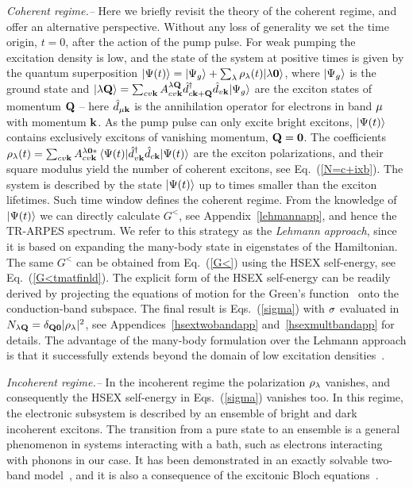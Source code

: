 \documentclass[twocolumn,aps,a4paper,superscriptaddress]{revtex4-2}
\begin{document}
{\em Coherent regime.--} Here we briefly revisit the
theory of the coherent regime, and offer an alternative perspective.
Without any
loss of generality we set
the time origin, $t=0$, after the action of the pump pulse. For weak
pumping the excitation density is low, and
the state of the system at positive times is given by the quantum
superposition
$|\Psi(t)\rangle=|\Psi_{g}\rangle+\sum_{\lambda}\rho_{\lambda}(t)|\lambda\mathbf 0\rangle$, where
$|\Psi_{g}\rangle$ is the ground state and
$|\lambda{\mathbf Q}\rangle=\sum_{cv{\mathbf k}}A^{\lambda{\mathbf Q}}_{cv{\mathbf k}}\hat{d}^{\dag}_{c{\mathbf k}+{\mathbf Q}}\hat{d}_{v{\mathbf k}}|\Psi_{g}\rangle$
are the exciton states of momentum ${\mathbf Q}$ -- here
$\hat{d}_{\mu{\mathbf k}}$ is the annihilation operator for electrons in band
$\mu$ with momentum ${\mathbf k}$. As the pump pulse
can only excite bright excitons,  $|\Psi(t)\rangle$ contains
exclusively excitons of vanishing momentum, ${\mathbf Q}=\mathbf 0$. The coefficients
$\rho_{\lambda}(t)=\sum_{cv{\mathbf k}}A^{\lambda\mathbf 0\ast}_{cv{\mathbf k}}\,
\langle\Psi(t)|\hat{d}^{\dag}_{v{\mathbf k}}\hat{d}_{c{\mathbf k}}|\Psi(t)\rangle$ are the
exciton polarizations, and their square modulus yield the number of
coherent excitons, see Eq.~(\ref{N=c+ixb}). The
system is described by the state $|\Psi(t)\rangle$
up to times smaller than the exciton lifetimes.
Such time window defines the coherent regime. From
the knowledge of $|\Psi(t)\rangle$ we can directly calculate $G^{<}$, see
Appendix~\ref{lehmannapp}, and hence the
TR-ARPES spectrum. We refer to this strategy as the {\em Lehmann
approach}, since it is based on expanding the many-body state in
eigenstates of the Hamiltonian.
The same $G^{<}$ can be
obtained from Eq.~(\ref{G<}) using
the HSEX self-energy, see Eq.~(\ref{G<tmatfinld}).
The explicit form
of the HSEX self-energy can be readily derived
by projecting the equations of motion for the Green's
function~\cite{perfetto_pump-driven_2019,perfetto_time-resolved_2020} onto
the conduction-band subspace. The final result is
Eqs.~(\ref{sigma}) with $\sigma$ evaluated in
$N_{\lambda{\mathbf Q}}=\delta_{{\mathbf Q}\mathbf 0}|\rho_{\lambda}|^{2}$, see
Appendices~\ref{hsextwobandapp} and~\ref{hsexmultbandapp} for details.
The advantage of the many-body formulation over the
Lehmann approach is
that it successfully extends beyond the domain of low excitation
densities~\cite{pareek_driving_2026}.

{\em Incoherent regime.--}
In the incoherent regime the
polarization $\rho_{\lambda}$ vanishes, and consequently the HSEX
self-energy in Eqs.~(\ref{sigma}) vanishes too.
In this regime, the
electronic subsystem is described by an ensemble of bright and dark
incoherent excitons.
The transition from a pure state to an ensemble is a general
phenomenon in systems interacting with a bath, such as
electrons interacting with phonons in our case.
It has been demonstrated in an exactly  solvable two-band
model~\cite{stefanucci_from-carriers_2021,zhang_long-lived_2025},
and it is also a consequence of the excitonic Bloch
equations~\cite{thranhardt_quantum_2000,selig_exciton_2016,brem_exciton_2018,stefanucci_excitonic_2025}.
\end{document}
